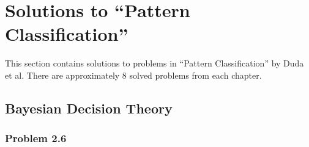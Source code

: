 \documentclass[12pt, a4paper]{article}
\begin{document}
\clearpage
\section{Solutions to ``Pattern Classification''}

This section contains solutions to problems in ``Pattern Classification'' by Duda et al.
There are approximately 8 solved problems from each chapter.

\setcounter{subsection}{1}
\subsection{Bayesian Decision Theory}

\subsubsection*{Problem 2.6}
\end{document}
